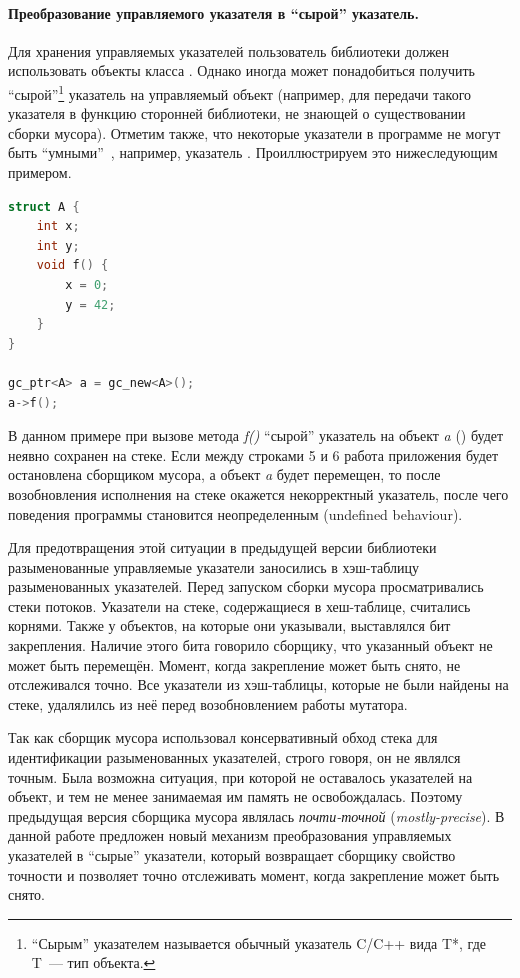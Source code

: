 \paragraph{Преобразование управляемого указателя в ``сырой'' указатель.}
Для хранения управляемых указателей пользователь библиотеки должен использовать объекты 
класса . 
Однако иногда может понадобиться получить ``сырой''\footnote{``Сырым'' указателем 
называется обычный указатель C/C++ вида T*, где T~--- тип объекта.} указатель на 
управляемый объект (например, для передачи такого указателя в функцию сторонней библиотеки, 
не знающей о существовании сборки мусора). 
Отметим также, что некоторые указатели в программе не могут быть 
``умными''~\cite{book:jones1996garbage}, например, указатель . 
Проиллюстрируем это нижеследующим примером.

\begin{minipage}{\linewidth}
\begin{lstlisting}[language={c++}, caption={Неявное разыменование 
	\code{gc\_ptr}}, label={code:this_example}]
struct A {
    int x;
    int y;
    void f() {
        x = 0;
        y = 42;
    }
}

gc_ptr<A> a = gc_new<A>();
a->f();
\end{lstlisting}
\end{minipage}

В данном примере при вызове метода \emph{f()} ``сырой'' указатель на объект \emph{a} 
() будет неявно сохранен на стеке. 
Если между строками 5 и 6 работа приложения будет остановлена сборщиком мусора, а объект 
\emph{a} будет перемещен, то после возобновления исполнения на стеке окажется некорректный 
указатель, после чего поведения программы становится неопределенным (undefined behaviour). 

Для предотвращения этой ситуации в предыдущей версии библиотеки разыменованные управляемые 
указатели заносились в хэш-таблицу разыменованных указателей. 
Перед запуском сборки мусора просматривались стеки потоков. 
Указатели на стеке, содержащиеся в хеш-таблице, считались корнями. 
Также у объектов, на которые они указывали, выставлялся бит закрепления. 
Наличие этого бита говорило сборщику, что указанный объект не может быть перемещён. 
Момент, когда закрепление может быть снято, не отслеживался точно. 
Все указатели из хэш-таблицы, которые не были найдены на стеке, удалялилсь из неё перед 
возобновлением работы мутатора.

Так как сборщик мусора использовал консервативный обход стека для идентификации 
разыменованных указателей, строго говоря, он не являлся точным. 
Была возможна ситуация, при которой не оставалось указателей на объект, и тем не менее 
занимаемая им память не освобождалась. 
Поэтому предыдущая версия сборщика мусора являлась \emph{почти-точной} (\emph{mostly-precise}). 
В данной работе предложен новый механизм преобразования управляемых указателей в ``сырые'' 
указатели, который возвращает сборщику свойство точности и позволяет точно отслеживать 
момент, когда закрепление может быть снято.
